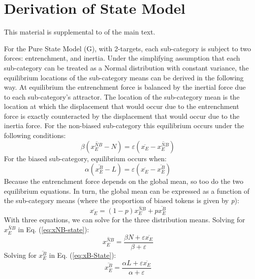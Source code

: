 \chapter{\label{chap:Appendix C}Derivation of State Model}

This material is supplemental to 
of the main text.

For the Pure State Model (G), with 2-targets, each sub-category is
subject to two forces: entrenchment, and inertia. Under the simplifying
assumption that each sub-category can be treated as a Normal distribution
with constant variance, the equilibrium locations of the sub-category
means can be derived in the following way. At equilibrium the entrenchment
force is balanced by the inertial force due to each sub-category's
attractor. The location of the sub-category mean is the location at
which the displacement that would occur due to the entrenchment force
is exactly counteracted by the displacement that would occur due
to the inertia force. For the non-biased sub-category this equilibrium
occurs under the following conditions:
\begin{equation}
\beta\left(\overline{x_{E}^{NB}}-N\right)=\varepsilon\left(\overline{x_{E}}-\overline{x_{E}^{NB}}\right)\label{eq:xNB-state}
\end{equation}
For the biased sub-category, equilibrium occurs when:
\begin{equation}
\alpha\left(\overline{x_{E}^{B}}-L\right)=\varepsilon\left(\overline{x_{E}}-\overline{x_{E}^{B}}\right)\label{eq:xB-State}
\end{equation}
Because the entrenchment force depends on the global mean, so too
do the two equilibrium equations. In turn, the global mean can be
expressed as a function of the sub-category means (where the proportion
of biased tokens is given by \emph{p}): 
\begin{equation}
\overline{x_{E}}=(1-p)\overline{x_{E}^{NB}}+p\overline{x_{E}^{B}}\label{eq:weighted-means}
\end{equation}
With three equations, we can solve for the three distribution means.
Solving for $\overline{x_{E}^{NB}}$ in Eq. (\ref{eq:xNB-state}):
\begin{equation}
\overline{x_{E}^{NB}}=\frac{\beta N+\varepsilon\overline{x_{E}}}{\beta+\varepsilon}
\end{equation}
Solving for $\overline{x_{E}^{B}}$ in Eq. (\ref{eq:xB-State}):
\begin{equation}
\overline{x_{E}^{B}}=\frac{\alpha L+\varepsilon\overline{x_{E}}}{\alpha+\varepsilon}
\end{equation}
